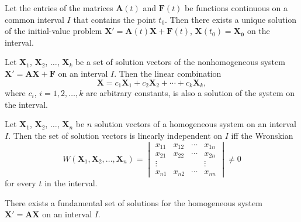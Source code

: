 \documentclass{article}
\begin{document}
\begin{thm} 
    Let the entries of the matrices \(\mathbf{A}(t)\) and \(\mathbf{F}(t)\) be functions continuous on a common interval \(I\) that contains the point \(t_0\). Then there exists a unique solution of the initial-value problem \(\mathbf{X'} = \mathbf{A}(t)\mathbf{X} + \mathbf{F}(t)\), \(\mathbf{X}(t_0) = \mathbf{X_0}\) on the interval.
\end{thm}

\begin{thm} 
    Let \(\mathbf{X}_1\), \(\mathbf{X}_2\), \(\ldots\), \(\mathbf{X}_k\) be a set of solution vectors of the nonhomogeneous system \(\mathbf{X'} = \mathbf{A}\mathbf{X} + \mathbf{F}\) on an interval \(I\). Then the linear combination
    \begin{equation}
        \mathbf{X} = c_1\mathbf{X}_1 + c_2\mathbf{X}_2 + \cdots + c_k\mathbf{X}_k,
    \end{equation}
    where \(c_i\), \(i = 1, 2, \ldots, k\) are arbitrary constants, is also a solution of the system on the interval.
    
\end{thm}

\begin{thm} 
    Let \(\mathbf{X}_1\), \(\mathbf{X}_2\), \(\ldots\), \(\mathbf{X}_n\) be \(n\) solution vectors of a homogeneous system on an interval \(I\). Then the set of solution vectors is linearly independent on \(I\) iff the Wronskian
    \begin{equation}
        W(\mathbf{X}_1, \mathbf{X}_2, \ldots, \mathbf{X}_n) = \begin{vmatrix}
            x_{11} & x_{12} & \cdots & x_{1n}\\
            x_{21} & x_{22} & \cdots & x_{2n}\\
            \vdots & & & \vdots\\
            x_{n1} & x_{n2} & \cdots & x_{nn} 
        \end{vmatrix} \neq 0
    \end{equation}
    for every \(t\) in the interval.
\end{thm}

\begin{thm} 
    There exists a fundamental set of solutions for the homogeneous system \(\mathbf{X'} = \mathbf{AX}\) on an interval \(I\).
\end{thm}
\end{document}
